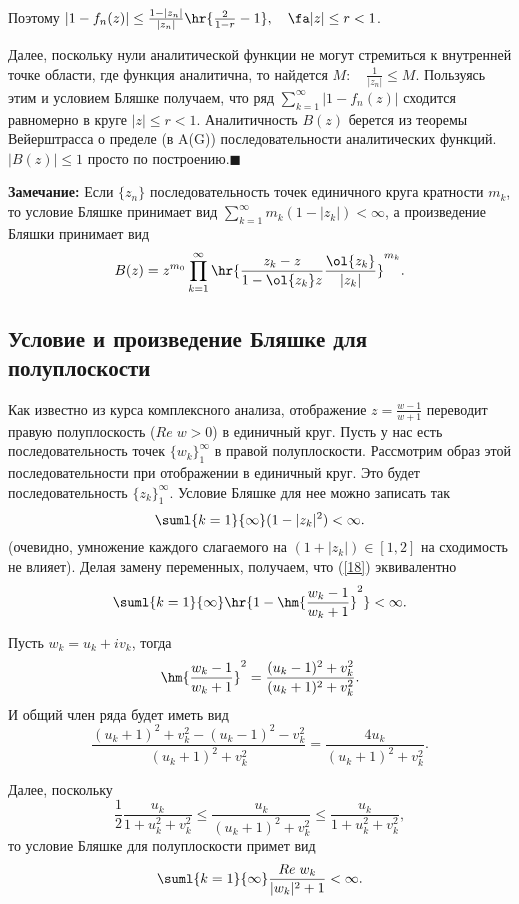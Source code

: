 \documentclass[a4paper]{article}
\begin{document}
Поэтому
$|1-f_n(z)|\le\frac{1-|z_n|}{|z_n|}\hr{\frac2{1-r}-1},\quad\fa
|z|\le r<1$.

Далее, поскольку нули аналитической функции не могут стремиться к внутренней точке области, где функция
аналитична, то найдется $M:\quad \frac1{|z_n|}\le M$. Пользуясь этим и условием Бляшке получаем, что ряд
$\sum_{k=1}^{\infty}|1-f_n(z)|$ сходится равномерно в круге $|z|\le r<1$. Аналитичность $B(z)$ берется из
теоремы Вейерштрасса о пределе (в A(G)) последовательности аналитических функций. $|B(z)|\le1$ просто по
построению.$\blacksquare$

\noindent\textbf{Замечание:} Если $\{z_n\}$ последовательность
точек единичного круга кратности $m_k$, то условие Бляшке
принимает вид $\sum_{k=1}^{\infty} m_k(1-|z_k|)<\infty$, а
произведение Бляшки принимает вид
$$B(z)=z^{m_0}\prod\limits_{k=1}^{\infty}\hr{\frac{z_k-z}{1-\ol{z_k}z}\frac{\ol{z_k}}{|z_k|}}^{m_k}.$$

\subsection{Условие и произведение Бляшке для полуплоскости}
Как известно из курса комплексного анализа, отображение
$z=\frac{w-1}{w+1}$ переводит правую полуплоскость ($Re\;w>0$) в
единичный круг. Пусть у нас есть последовательность точек
$\{w_k\}_1^{\infty}$ в правой полуплоскости. Рассмотрим образ этой
последовательности при отображении в единичный круг. Это будет
последовательность $\{z_k\}_1^{\infty}$. Условие Бляшке для нее
можно записать так
\begin{equation}\label{18}
\suml{k=1}{\infty}(1-|z_k|^2)<\infty.
\end{equation}
(очевидно, умножение каждого слагаемого на $(1+|z_k|)\in[1,2]$ на
сходимость не влияет). Делая замену переменных, получаем, что
(\ref{18}) эквивалентно
\begin{equation}
\suml{k=1}{\infty}\hr{1-\hm{\frac{w_k-1}{w_k+1}}^2}<\infty.
\end{equation}

Пусть $w_k=u_k+iv_k$, тогда
$$\hm{\frac{w_k-1}{w_k+1}}^2=\frac{(u_k-1)^2+v_k^2}{(u_k+1)^2+v_k^2}.$$
И общий член ряда будет иметь вид
$$\frac{(u_k+1)^2+v_k^2-(u_k-1)^2-v_k^2}{(u_k+1)^2+v_k^2}=\frac{4u_k}{(u_k+1)^2+v_k^2}.$$

Далее, поскольку
$$\frac12\frac{u_k}{1+u_k^2+v_k^2}\le\frac{u_k}{(u_k+1)^2+v_k^2}\le\frac{u_k}{1+u_k^2+v_k^2},$$
то условие Бляшке для полуплоскости примет вид
\begin{equation}\label{19}
\suml{k=1}{\infty} \frac{Re\;w_k}{|w_k|^2+1}<\infty.
\end{equation}
\end{document}

